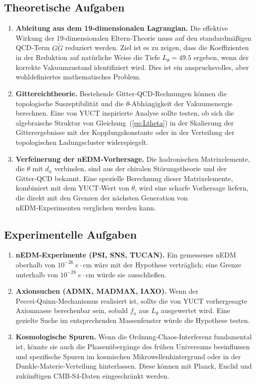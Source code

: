 \documentclass[12pt,a4paper]{article}
\begin{document}
	\subsection{Theoretische Aufgaben}
	\begin{enumerate}
		\item \textbf{Ableitung aus dem 19‑dimensionalen Lagrangian.}
		Die effektive Wirkung der 19‑dimensionalen Eltern‑Theorie muss auf den standardmäßigen QCD‑Term \(G\widetilde{G}\) reduziert werden. Ziel ist es zu zeigen, dass die Koeffizienten in der Reduktion auf natürliche Weise die Tiefe \(L_\theta = 49.5\) ergeben, wenn der korrekte Vakuumzustand identifiziert wird. Dies ist ein anspruchsvolles, aber wohldefiniertes mathematisches Problem.
		\item \textbf{Gittereichtheorie.}
		Bestehende Gitter‑QCD‑Rechnungen können die topologische Suszeptibilität und die \(\theta\)-Abhängigkeit der Vakuumenergie berechnen. Eine von YUCT inspirierte Analyse sollte testen, ob sich die algebraische Struktur von Gleichung~(\ref{eq:Ltheta}) in der Skalierung der Gitterergebnisse mit der Kopplungskonstante oder in der Verteilung der topologischen Ladungscluster widerspiegelt.
		\item \textbf{Verfeinerung der nEDM‑Vorhersage.}
		Die hadronischen Matrixelemente, die \(\theta\) mit \(d_n\) verbinden, sind aus der chiralen Störungstheorie und der Gitter‑QCD bekannt. Eine spezielle Berechnung dieser Matrixelemente, kombiniert mit dem YUCT‑Wert von \(\theta\), wird eine scharfe Vorhersage liefern, die direkt mit den Grenzen der nächsten Generation von nEDM‑Experimenten verglichen werden kann.
	\end{enumerate}
	
	\subsection{Experimentelle Aufgaben}
	\begin{enumerate}
		\item \textbf{nEDM‑Experimente (PSI, SNS, TUCAN).}
		Ein gemessenes nEDM oberhalb von \(10^{-26}\;e\!\cdot\!\mathrm{cm}\) wäre mit der Hypothese verträglich; eine Grenze unterhalb von \(10^{-28}\;e\!\cdot\!\mathrm{cm}\) würde sie ausschließen.
		\item \textbf{Axionsuchen (ADMX, MADMAX, IAXO).}
		Wenn der Peccei‑Quinn‑Mechanismus realisiert ist, sollte die von YUCT vorhergesagte Axionmasse berechenbar sein, sobald \(f_a\) aus \(L_\theta\) ausgewertet wird. Eine gezielte Suche im entsprechenden Massenfenster würde die Hypothese testen.
		\item \textbf{Kosmologische Spuren.}
		Wenn die Ordnung‑Chaos‑Interferenz fundamental ist, könnte sie auch die Phasenübergänge des frühen Universums beeinflussen und spezifische Spuren im kosmischen Mikrowellenhintergrund oder in der Dunkle‑Materie‑Verteilung hinterlassen. Diese können mit Planck, Euclid und zukünftigen CMB‑S4‑Daten eingeschränkt werden.
	\end{enumerate}
	
\end{document}
